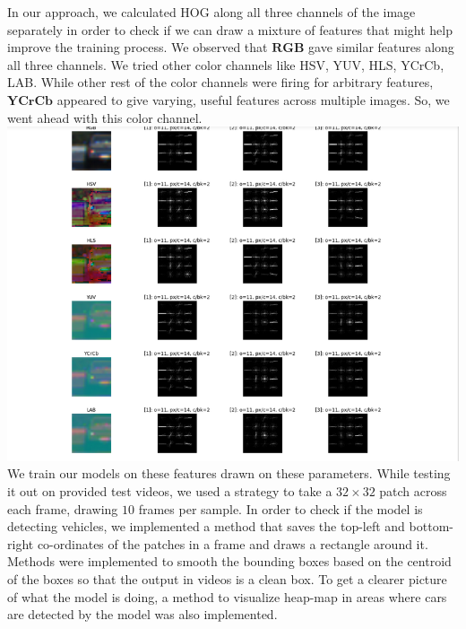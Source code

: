 \documentclass{article}
\begin{document}
In our approach, we calculated HOG along all three channels of the image separately in order to check if we can draw a mixture of features that might help improve the training process. We observed that $\textbf{RGB}$ gave similar features along all three channels. We tried other color channels like HSV, YUV, HLS, YCrCb, LAB. While other rest of the color channels were firing for arbitrary features, $\textbf{YCrCb}$ appeared to give varying, useful features across multiple images. So, we went ahead with this color channel.\\\includegraphics[width=\textwidth]{colors.png}
 We train our models on these features drawn on these parameters. While testing it out on provided test videos\cite{Sivaraman}, we used a strategy to take a $32\times32$ patch across each frame, drawing $10$ frames per sample. In order to check if the model is detecting vehicles, we implemented a method that saves the top-left and bottom-right co-ordinates of the patches in a frame and draws a rectangle around it. Methods were implemented to smooth the bounding boxes based on the centroid of the boxes so that the output in videos is a clean box. To get a clearer picture of what the model is doing, a method to visualize heap-map in areas where cars are detected by the model was also implemented.
\end{document}
